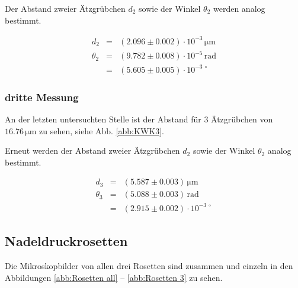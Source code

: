\documentclass[12pt,a4paper]{scrartcl}
\numberwithin{equation}{section} %
\begin{document}
Der Abstand zweier Ätzgrübchen $d_2$ sowie der Winkel $\theta_2$ werden analog bestimmt.

\begin{eqnarray}
    d_2 & = & (2.096\pm 0.002) \cdot 10^{-3} \mathrm{\, \mu m} \\
    \theta_2 &=& (9.782 \pm 0.008) \cdot 10^{-5} \mathrm{\, rad} \\
        &=& (5.605 \pm 0.005) \cdot 10^{-3\ \circ}
\end{eqnarray}

\hypertarget{dritte-messung}{%
\subsubsection{dritte Messung}\label{dritte-messung}}

An der letzten untersuchten Stelle ist der Abstand für $3$ Ätzgrübchen von $16.76 \mathrm{\, \mu m}$ zu sehen, siehe Abb. \ref{abb:KWK3}.

Erneut werden der Abstand zweier Ätzgrübchen $d_2$ sowie der Winkel $\theta_2$ analog bestimmt.

\begin{eqnarray}
    d_3 &=& (5.587 \pm 0.003) \mathrm{\, \mu m} \\
    \theta_3 &=& (5.088 \pm 0.003) \mathrm{\, rad} \\
        &=& (2.915 \pm 0.002) \cdot 10^{-3\ \circ}
\end{eqnarray}

\hypertarget{nadeldruckrosetten-1}{%
\subsection{Nadeldruckrosetten}\label{nadeldruckrosetten-1}}

Die Mikroskopbilder von allen drei Rosetten sind zusammen und einzeln in den Abbildungen \ref{abb:Rosetten all} -- \ref{abb:Rosetten 3} zu sehen.
\end{document}
